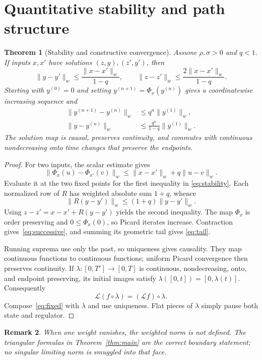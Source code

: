 \documentclass[10pt]{article}
\newtheorem{theorem}{Theorem}
\newtheorem{remark}[theorem]{Remark}
\newcommand{\norm}[1]{\lVert#1\rVert}
\newcommand{\calL}{\mathcal L}
\begin{document}
\section{Quantitative stability and path structure}
\begin{theorem}[Stability and constructive convergence]\label{thm:stable}
Assume $\rho,\sigma>0$ and $q<1$.  If inputs $x,x'$ have solutions
$(z,y),(z',y')$, then
\begin{equation}\label{eq:stability}
 \norm{y-y'}_w\leq\frac{\norm{x-x'}_w}{1-q},
 \qquad
 \norm{z-z'}_w\leq\frac{2\norm{x-x'}_w}{1-q}.
\end{equation}
Starting with $y^{(0)}=0$ and setting
$y^{(n+1)}=\Phi_x(y^{(n)})$ gives a coordinatewise increasing sequence and
\begin{align}
 \norm{y^{(n+1)}-y^{(n)}}_w&\leq
 q^n\norm{y^{(1)}}_w,\label{eq:successive}\\
 \norm{y-y^{(n)}}_w&\leq
 \frac{q^n}{1-q}\norm{y^{(1)}}_w.\label{eq:tail}
\end{align}
The solution map is causal, preserves continuity, and commutes with continuous
nondecreasing onto time changes that preserve the endpoints.
\end{theorem}

\begin{proof}
For two inputs, the scalar estimate gives
\[
 \norm{\Phi_x(u)-\Phi_{x'}(v)}_w
 \leq\norm{x-x'}_w+q\norm{u-v}_w.
\]
Evaluate it at the two fixed points for the first inequality in
\eqref{eq:stability}.  Each normalized row of $R$ has weighted absolute sum
$1+q$, whence
\[
 \norm{R(y-y')}_w\leq(1+q)\norm{y-y'}_w.
\]
Using $z-z'=x-x'+R(y-y')$ yields the second inequality.  The map $\Phi_x$ is
order preserving and $0\leq\Phi_x(0)$, so Picard iterates increase.
Contraction gives~\eqref{eq:successive}, and summing its geometric tail gives
\eqref{eq:tail}.

Running suprema use only the past, so uniqueness gives causality.  They map
continuous functions to continuous functions; uniform Picard convergence then
preserves continuity.  If
$\lambda:[0,T']\to[0,T]$ is continuous, nondecreasing, onto, and endpoint
preserving, its initial images satisfy
$\lambda([0,t])=[0,\lambda(t)]$.  Consequently
\[
 \calL(f\circ\lambda)=(\calL f)\circ\lambda.
\]
Compose~\eqref{eq:fixed} with $\lambda$ and use uniqueness.  Flat pieces of
$\lambda$ simply pause both state and regulator.
\end{proof}

\begin{remark}
When one weight vanishes, the weighted norm is not defined.  The triangular
formulas in Theorem~\ref{thm:main} are the correct boundary statement; no
singular limiting norm is smuggled into that face.
\end{remark}
\fi
\end{document}
